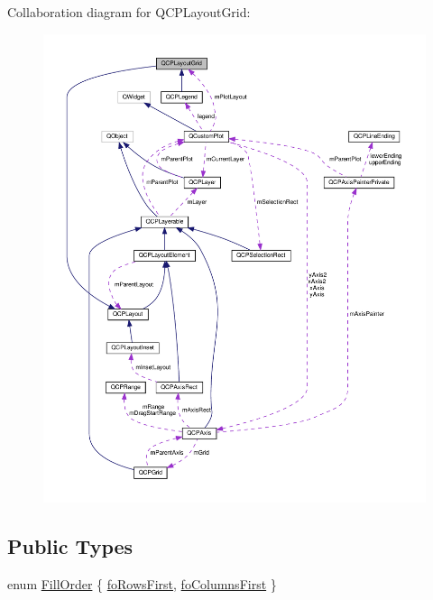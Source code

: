 Collaboration diagram for Q\+C\+P\+Layout\+Grid\+:\nopagebreak
\begin{figure}[H]
\begin{center}
\leavevmode
\includegraphics[width=350pt]{classQCPLayoutGrid__coll__graph}
\end{center}
\end{figure}
\subsection*{Public Types}
\begin{DoxyCompactItemize}
\item 
enum \hyperlink{classQCPLayoutGrid_a7d49ee08773de6b2fd246edfed353cca}{Fill\+Order} \{ \hyperlink{classQCPLayoutGrid_a7d49ee08773de6b2fd246edfed353ccaa0202730954e26c474cc820164aedce3e}{fo\+Rows\+First}, 
\hyperlink{classQCPLayoutGrid_a7d49ee08773de6b2fd246edfed353ccaac4cb4b796ec4822d5894b47b51627fb3}{fo\+Columns\+First}
 \}
\end{DoxyCompactItemize}

